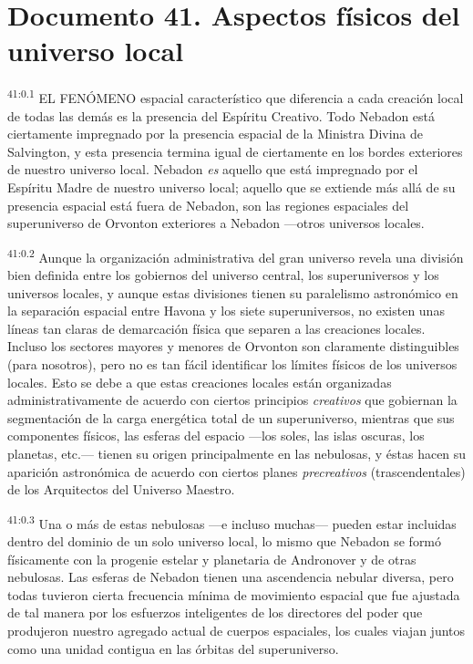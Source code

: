\chapter{Documento 41. Aspectos físicos del universo local}
\par
\textsuperscript{41:0.1} EL FENÓMENO espacial característico que diferencia a cada creación local de todas las demás es la presencia del Espíritu Creativo. Todo Nebadon está ciertamente impregnado por la presencia espacial de la Ministra Divina de Salvington, y esta presencia termina igual de ciertamente en los bordes exteriores de nuestro universo local. Nebadon \textit{es} aquello que está impregnado por el Espíritu Madre de nuestro universo local; aquello que se extiende más allá de su presencia espacial está fuera de Nebadon, son las regiones espaciales del superuniverso de Orvonton exteriores a Nebadon ---otros universos locales.

\par
\textsuperscript{41:0.2} Aunque la organización administrativa del gran universo revela una división bien definida entre los gobiernos del universo central, los superuniversos y los universos locales, y aunque estas divisiones tienen su paralelismo astronómico en la separación espacial entre Havona y los siete superuniversos, no existen unas líneas tan claras de demarcación física que separen a las creaciones locales. Incluso los sectores mayores y menores de Orvonton son claramente distinguibles (para nosotros), pero no es tan fácil identificar los límites físicos de los universos locales. Esto se debe a que estas creaciones locales están organizadas administrativamente de acuerdo con ciertos principios \textit{creativos} que gobiernan la segmentación de la carga energética total de un superuniverso, mientras que sus componentes físicos, las esferas del espacio ---los soles, las islas oscuras, los planetas, etc.--- tienen su origen principalmente en las nebulosas, y éstas hacen su aparición astronómica de acuerdo con ciertos planes \textit{precreativos} (trascendentales) de los Arquitectos del Universo Maestro.

\par
\textsuperscript{41:0.3} Una o más de estas nebulosas ---e incluso muchas--- pueden estar incluidas dentro del dominio de un solo universo local, lo mismo que Nebadon se formó físicamente con la progenie estelar y planetaria de Andronover y de otras nebulosas. Las esferas de Nebadon tienen una ascendencia nebular diversa, pero todas tuvieron cierta frecuencia mínima de movimiento espacial que fue ajustada de tal manera por los esfuerzos inteligentes de los directores del poder que produjeron nuestro agregado actual de cuerpos espaciales, los cuales viajan juntos como una unidad contigua en las órbitas del superuniverso.

